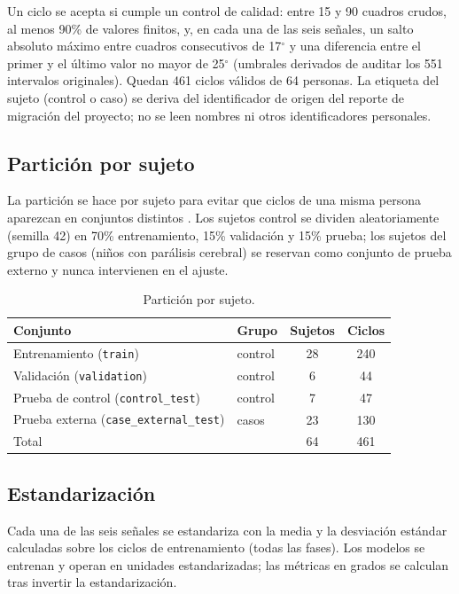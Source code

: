\documentclass[11pt,a4paper]{article}
\newcommand{\gr}{$^{\circ}$}
\begin{document}
Un ciclo se acepta si cumple un control de calidad: entre 15 y 90 cuadros crudos, al menos 90\% de valores finitos, y, en cada una de las seis señales, un salto absoluto máximo entre cuadros consecutivos de 17\gr{} y una diferencia entre el primer y el último valor no mayor de 25\gr{} (umbrales derivados de auditar los 551 intervalos originales). Quedan 461 ciclos válidos de 64 personas. La etiqueta del sujeto (control o caso) se deriva del identificador de origen del reporte de migración del proyecto; no se leen nombres ni otros identificadores personales.

\subsection{Partición por sujeto}

La partición se hace por sujeto para evitar que ciclos de una misma persona aparezcan en conjuntos distintos \cite{saeb2017}. Los sujetos control se dividen aleatoriamente (semilla 42) en 70\% entrenamiento, 15\% validación y 15\% prueba; los sujetos del grupo de casos (niños con parálisis cerebral) se reservan como conjunto de prueba externo y nunca intervienen en el ajuste.

\begin{table}[h]
\centering\small
\begin{tabular}{llcc}
\toprule
Conjunto & Grupo & Sujetos & Ciclos \\
\midrule
Entrenamiento (\texttt{train}) & control & 28 & 240 \\
Validación (\texttt{validation}) & control & 6 & 44 \\
Prueba de control (\texttt{control\_test}) & control & 7 & 47 \\
Prueba externa (\texttt{case\_external\_test}) & casos & 23 & 130 \\
\midrule
Total & & 64 & 461 \\
\bottomrule
\end{tabular}
\caption{Partición por sujeto.}
\end{table}

\subsection{Estandarización}

Cada una de las seis señales se estandariza con la media y la desviación estándar calculadas sobre los ciclos de entrenamiento (todas las fases). Los modelos se entrenan y operan en unidades estandarizadas; las métricas en grados se calculan tras invertir la estandarización.
\end{document}
